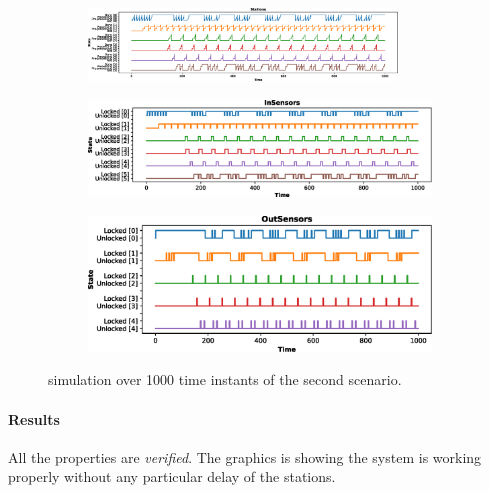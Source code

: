 \documentclass[a4paper]{article}
\begin{document}
    \begin{figure}[h!]
        \begin{subfigure}{\textwidth}
            \centering
            \includegraphics[width=0.9\textwidth]{images/scenarios/scenario2_stations}
        \end{subfigure}
        \begin{subfigure}{0.49\textwidth}
            \centering
            \includegraphics[width=\textwidth]{images/scenarios/scenario2_insensors}
        \end{subfigure}
        \hfill
        \begin{subfigure}{0.49\textwidth}
            \centering
            \includegraphics[width=\textwidth]{images/scenarios/scenario2_outsensors}
        \end{subfigure}
        \caption{simulation over 1000 time instants of the second scenario.}
        \label{figure:scenario:2}
    \end{figure}

    \paragraph{Results} All the properties are \textit{verified}. The graphics is showing the system is working properly without any particular delay of the stations.
\end{document}
